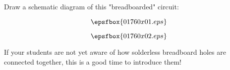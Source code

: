

Draw a schematic diagram of this "breadboarded" circuit:

$$\epsfbox{01760x01.eps}$$







$$\epsfbox{01760x02.eps}$$







If your students are not yet aware of how solderless breadboard holes are connected together, this is a good time to introduce them!




